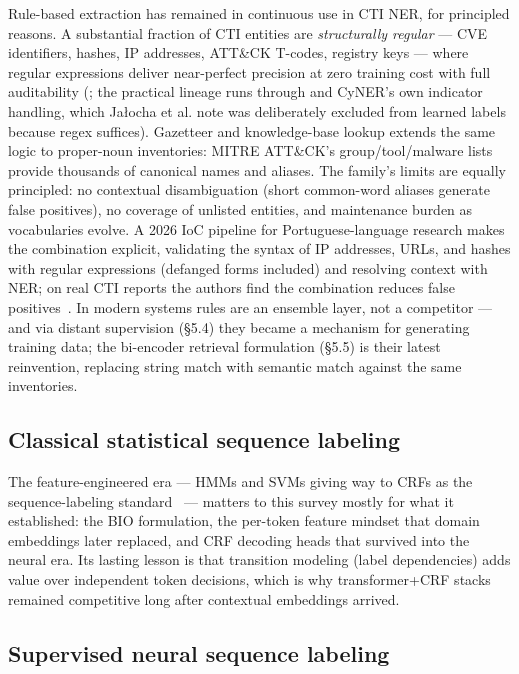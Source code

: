 \documentclass[11pt]{article}
\begin{document}
Rule-based extraction has remained in continuous use in CTI NER, for principled reasons. A substantial fraction of CTI entities are \emph{structurally regular} — CVE identifiers, hashes, IP addresses, ATT\&CK T-codes, registry keys — where regular expressions deliver near-perfect precision at zero training cost with full auditability (\citealp{echchammakhy2025cyberner}; the practical lineage runs through \citet{hanks2022recognizing} and CyNER's own indicator handling, which Ja\l{}ocha et al. note was deliberately excluded from learned labels because regex suffices). Gazetteer and knowledge-base lookup extends the same logic to proper-noun inventories: MITRE ATT\&CK's group/tool/malware lists provide thousands of canonical names and aliases. The family's limits are equally principled: no contextual disambiguation (short common-word aliases generate false positives), no coverage of unlisted entities, and maintenance burden as vocabularies evolve. A 2026 IoC pipeline for Portuguese-language research makes the combination explicit, validating the syntax of IP addresses, URLs, and hashes with regular expressions (defanged forms included) and resolving context with NER; on real CTI reports the authors find the combination reduces false positives~\citep{caxias2026ioc}. In modern systems rules are an ensemble layer, not a competitor — and via distant supervision (§5.4) they became a mechanism for generating training data; the bi-encoder retrieval formulation (§5.5) is their latest reinvention, replacing string match with semantic match against the same inventories.

\subsection{Classical statistical sequence labeling}

The feature-engineered era — HMMs and SVMs giving way to CRFs as the sequence-labeling standard~\citep{echchammakhy2025cyberner} — matters to this survey mostly for what it established: the BIO formulation, the per-token feature mindset that domain embeddings later replaced, and CRF decoding heads that survived into the neural era. Its lasting lesson is that transition modeling (label dependencies) adds value over independent token decisions, which is why transformer+CRF stacks remained competitive long after contextual embeddings arrived.

\subsection{Supervised neural sequence labeling}
\end{document}
